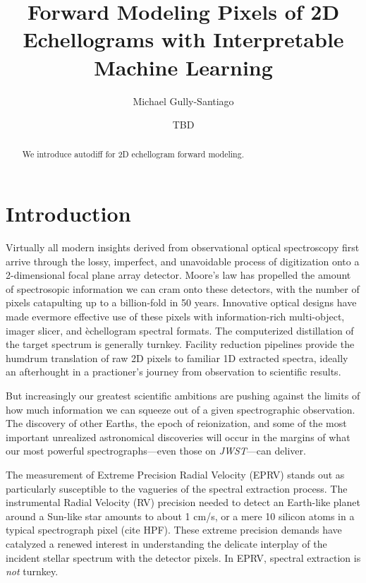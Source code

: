\documentclass[twocolumn]{aastex63}
\begin{document}
\title{Forward Modeling Pixels of 2D Echellograms with Interpretable Machine Learning}

\author{Michael Gully-Santiago}

\author{TBD}


\begin{abstract}

  We introduce autodiff for 2D echellogram forward modeling.

\end{abstract}



\section{Introduction}\label{sec:intro}

Virtually all modern insights derived from observational optical spectroscopy first arrive through the lossy, imperfect, and unavoidable process of digitization onto a 2-dimensional focal plane array detector.  Moore's law has propelled the amount of spectrosopic information we can cram onto these detectors, with the number of pixels catapulting up to a billion-fold in 50 years.  Innovative optical designs have made evermore effective use of these pixels with information-rich multi-object, imager slicer, and \`echellogram spectral formats.  The computerized distillation of the target spectrum is generally turnkey.  Facility reduction pipelines provide the humdrum translation of raw 2D pixels to familiar 1D extracted spectra, ideally an afterhought in a practioner's journey from observation to scientific results.

But increasingly our greatest scientific ambitions are pushing against the limits of how much information we can squeeze out of a given spectrographic observation.  The discovery of other Earths, the epoch of reionization, and some of the most important unrealized astronomical discoveries will occur in the margins of what our most powerful spectrographs---even those on \emph{JWST}---can deliver.

The measurement of Extreme Precision Radial Velocity (EPRV) stands out as particularly susceptible to the vagueries of the spectral extraction process.  The instrumental Radial Velocity (RV) precision needed to detect an Earth-like planet around a Sun-like star amounts to about 1 cm/s, or a mere 10 silicon atoms in a typical spectrograph pixel (cite HPF).  These extreme precision demands have catalyzed a renewed interest in understanding the delicate interplay of the incident stellar spectrum with the detector pixels.  In EPRV, spectral extraction is \emph{not} turnkey.
\end{document}

